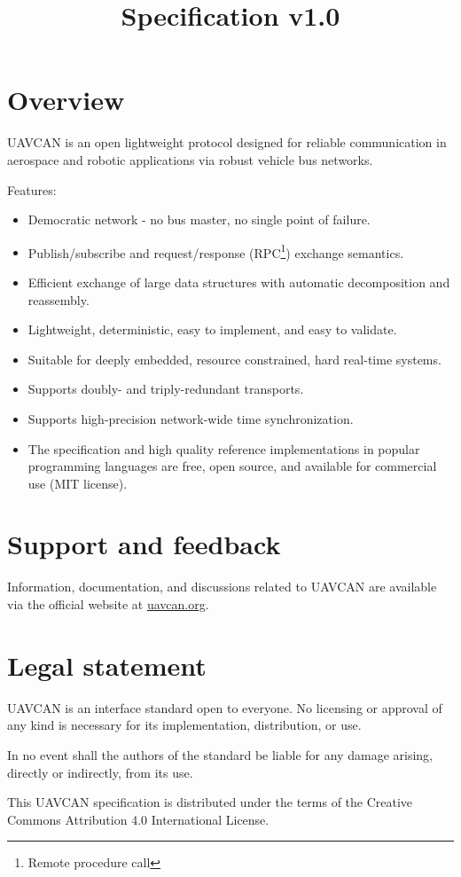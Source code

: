 \documentclass{uavcandoc}
\title{Specification v1.0}
\begin{document}
\frontmatter

\begin{titlepage}

\section*{Overview}

UAVCAN is an open lightweight protocol designed for reliable communication in aerospace and robotic applications via
robust vehicle bus networks.

Features:

\begin{itemize}
    \item Democratic network - no bus master, no single point of failure.
    \item Publish/subscribe and request/response (RPC\footnote{Remote procedure call}) exchange semantics.
    \item Efficient exchange of large data structures with automatic decomposition and reassembly.
    \item Lightweight, deterministic, easy to implement, and easy to validate.
    \item Suitable for deeply embedded, resource constrained, hard real-time systems.
    \item Supports doubly- and triply-redundant transports.
    \item Supports high-precision network-wide time synchronization.
    \item The specification and high quality reference implementations in popular programming languages are free,
    open source, and available for commercial use (MIT license).
\end{itemize}

\BeginRightColumn

\section*{Support and feedback}

Information, documentation, and discussions related to UAVCAN are available via the official website at
\href{http://uavcan.org}{uavcan.org}.

\section*{Legal statement}

UAVCAN is an interface standard open to everyone.
No licensing or approval of any kind is necessary for its implementation, distribution, or use.

In no event shall the authors of the standard be liable for any damage arising, directly or indirectly, from its use.

This UAVCAN specification is distributed under the terms of the Creative Commons Attribution 4.0 International License.

\end{titlepage}
\end{document}
